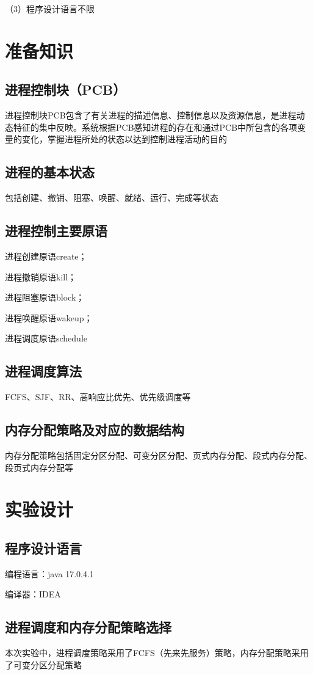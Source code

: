 \documentclass[UTF8,12pt]{article}
\begin{document}
（3）程序设计语言不限

\section{准备知识}
\subsection{进程控制块（PCB）}
进程控制块PCB包含了有关进程的描述信息、控制信息以及资源信息，是进程动态特征的集中反映。系统根据PCB感知进程的存在和通过PCB中所包含的各项变量的变化，掌握进程所处的状态以达到控制进程活动的目的

\subsection{进程的基本状态}
包括创建、撤销、阻塞、唤醒、就绪、运行、完成等状态

\subsection{进程控制主要原语}
进程创建原语create；

进程撤销原语kill；

进程阻塞原语block；

进程唤醒原语wakeup；

进程调度原语schedule

\subsection{进程调度算法}
FCFS、SJF、RR、高响应比优先、优先级调度等

\subsection{内存分配策略及对应的数据结构}
内存分配策略包括固定分区分配、可变分区分配、页式内存分配、段式内存分配、段页式内存分配等

\section{实验设计}
\subsection{程序设计语言}
编程语言：java 17.0.4.1

编译器：IDEA

\subsection{进程调度和内存分配策略选择}
本次实验中，进程调度策略采用了FCFS（先来先服务）策略，内存分配策略采用了可变分区分配策略
\end{document}
